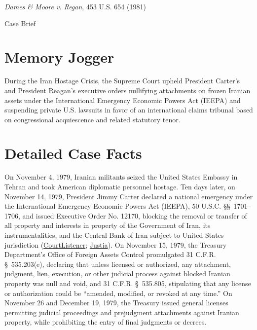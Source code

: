 \documentclass[12pt]{article}
\begin{document}
\begin{center}
{\LARGE \textit{Dames \& Moore v. Regan}, 453 U.S. 654 (1981)\par}
\vspace{0.8em}
{\large Case Brief\par}
\end{center}
\vspace{1em}

\section{Memory Jogger}
During the Iran Hostage Crisis, the Supreme Court upheld President Carter's and President Reagan's executive orders nullifying attachments on frozen Iranian assets under the International Emergency Economic Powers Act (IEEPA) and suspending private U.S. lawsuits in favor of an international claims tribunal based on congressional acquiescence and related statutory tenor.

\section{Detailed Case Facts}
On November 4, 1979, Iranian militants seized the United States Embassy in Tehran and took American diplomatic personnel hostage. Ten days later, on November 14, 1979, President Jimmy Carter declared a national emergency under the International Emergency Economic Powers Act (IEEPA), 50 U.S.C. \S\S\ 1701--1706, and issued Executive Order No. 12170, blocking the removal or transfer of all property and interests in property of the Government of Iran, its instrumentalities, and the Central Bank of Iran subject to United States jurisdiction (\href{https://www.courtlistener.com/opinion/110564/dames-moore-v-regan/}{CourtListener}; \href{https://supreme.justia.com/cases/federal/us/453/654/}{Justia}). On November 15, 1979, the Treasury Department's Office of Foreign Assets Control promulgated 31 C.F.R. \S\ 535.203(e), declaring that unless licensed or authorized, any attachment, judgment, lien, execution, or other judicial process against blocked Iranian property was null and void, and 31 C.F.R. \S\ 535.805, stipulating that any license or authorization could be ``amended, modified, or revoked at any time.'' On November 26 and December 19, 1979, the Treasury issued general licenses permitting judicial proceedings and prejudgment attachments against Iranian property, while prohibiting the entry of final judgments or decrees.
\end{document}

